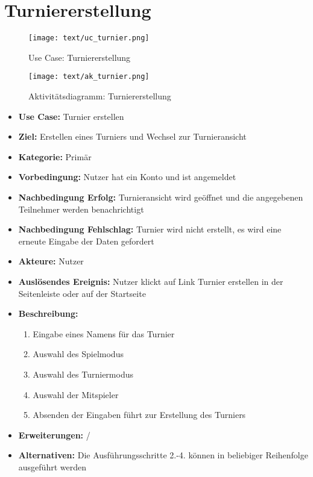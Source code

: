 \section{Turniererstellung}
\begin{figure}[h!]
	\centering
	\texttt{[image: text/uc\_turnier.png]}
	\caption{Use Case: Turniererstellung}
	\label{uc_turnier}
\end{figure}
\begin{figure}[h!]
	\centering
	\texttt{[image: text/ak\_turnier.png]}
	\caption{Aktivitätsdiagramm: Turniererstellung}
	\label{ak_turnier}
\end{figure}
\begin{itemize}
	\item \textbf{Use Case:} Turnier erstellen
	\item \textbf{Ziel:} Erstellen eines Turniers und Wechsel zur Turnieransicht
	\item \textbf{Kategorie:} Primär
	\item \textbf{Vorbedingung:} Nutzer hat ein Konto und ist angemeldet
	\item \textbf{Nachbedingung Erfolg:} Turnieransicht wird geöffnet und die angegebenen Teilnehmer werden benachrichtigt
	\item \textbf{Nachbedingung Fehlschlag:} Turnier wird nicht erstellt, es wird eine erneute Eingabe der Daten gefordert
	\item \textbf{Akteure:} Nutzer
	\item \textbf{Auslösendes Ereignis:} Nutzer klickt auf Link \glqq Turnier erstellen\grqq{} in der Seitenleiste oder auf der Startseite
	\item \textbf{Beschreibung:} \begin{enumerate}
		\item Eingabe eines Namens für das Turnier
		\item Auswahl des Spielmodus
		\item Auswahl des Turniermodus
		\item Auswahl der Mitspieler
		\item Absenden der Eingaben führt zur Erstellung des Turniers
	\end{enumerate}
	\item \textbf{Erweiterungen:} /
	\item \textbf{Alternativen:} Die Ausführungsschritte 2.-4. können in beliebiger Reihenfolge ausgeführt werden
\end{itemize}

